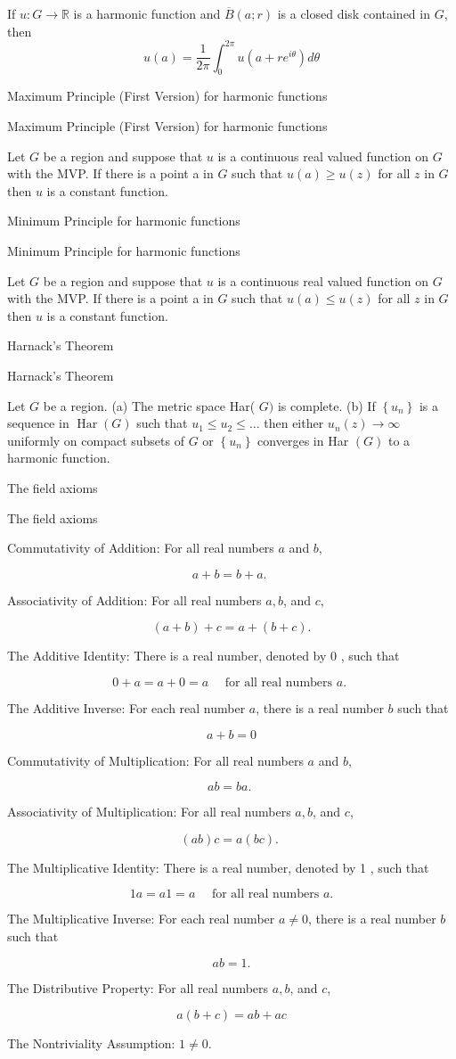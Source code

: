 \documentclass[17pt]{extarticle}
\renewcommand{\bar}[1]{\overline{#1}}
\newcommand{\boxset}[2]{\begin{mdframed}[style=darkQuesion]
#1
\end{mdframed}
\newpage
\begin{mdframed}[style=darkQuesion]
#1
  \end{mdframed}
\begin{mdframed}[style=darkAnswer]
#2
  \end{mdframed}
  \newpage
}
\begin{document}
{If $u: G \rightarrow \mathbb{R}$ is a harmonic function and $\bar{B}(a ; r)$ is a closed disk contained in $G$, then\[u(a)=\frac{1}{2 \pi} \int_{0}^{2 \pi} u\left(a+r e^{i \theta}\right) d \theta\]}
\boxset{Maximum Principle (First Version) for harmonic functions}
{Let $G$ be a region and suppose that $u$ is a continuous real valued function on $G$ with the MVP. If there is a point a in $G$ such that $u(a) \geq u(z)$ for all $z$ in $G$ then $u$ is a constant function.}
\boxset{Minimum Principle for harmonic functions}
{Let $G$ be a region and suppose that $u$ is a continuous real valued function on $G$ with the MVP. If there is a point a in $G$ such that $u(a) \leq u(z)$ for all $z$ in $G$ then $u$ is a constant function.}
\boxset{Harnack's Theorem}
{Let $G$ be a region. (a) The metric space Har( $G)$ is complete. (b) If $\left\{u_{n}\right\}$ is a sequence in $\operatorname{Har}(G)$ such that $u_{1} \leq u_{2} \leq \ldots$ then either $u_{n}(z) \rightarrow \infty$ uniformly on compact subsets of $G$ or $\left\{u_{n}\right\}$ converges in Har $(G)$ to a harmonic function.}
\boxset{The field axioms}
{
Commutativity of Addition: For all real numbers $a$ and $b$,

\[
a+b=b+a \text {. }
\]

Associativity of Addition: For all real numbers $a, b$, and $c$,

\[
(a+b)+c=a+(b+c) .
\]

The Additive Identity: There is a real number, denoted by 0 , such that

\[
0+a=a+0=a \quad \text { for all real numbers } a \text {. }
\]

The Additive Inverse: For each real number $a$, there is a real number $b$ such that

\[
a+b=0
\]

Commutativity of Multiplication: For all real numbers $a$ and $b$,

\[
a b=b a \text {. }
\]

Associativity of Multiplication: For all real numbers $a, b$, and $c$,

\[
(a b) c=a(b c) \text {. }
\]

The Multiplicative Identity: There is a real number, denoted by 1 , such that

\[
1 a=a 1=a \quad \text { for all real numbers } a .
\]

The Multiplicative Inverse: For each real number $a \neq 0$, there is a real number $b$ such that

\[
a b=1 .
\]

The Distributive Property: For all real numbers $a, b$, and $c$,

\[
a(b+c)=a b+a c
\]

The Nontriviality Assumption:
$1 \neq 0 .$
}
\end{document}
